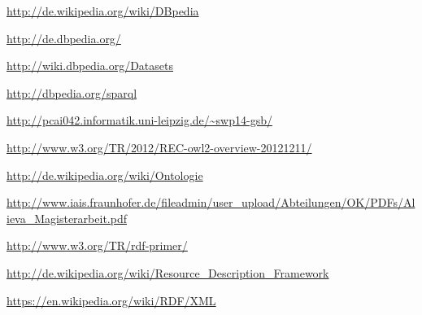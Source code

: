 



\begin{thebibliography}{99}
  \url{http://de.wikipedia.org/wiki/DBpedia}

  \url{http://de.dbpedia.org/}

  \url{http://wiki.dbpedia.org/Datasets}

  \url{http://dbpedia.org/sparql}

  \url{http://pcai042.informatik.uni-leipzig.de/~swp14-gsb/}




  \url{http://www.w3.org/TR/2012/REC-owl2-overview-20121211/}

  \url{http://de.wikipedia.org/wiki/Ontologie}

  \url{http://www.iais.fraunhofer.de/fileadmin/user_upload/Abteilungen/OK/PDFs/Alieva_Magisterarbeit.pdf}

  \url{http://www.w3.org/TR/rdf-primer/}

  \url{http://de.wikipedia.org/wiki/Resource_Description_Framework}

  \url{https://en.wikipedia.org/wiki/RDF/XML}



\end{thebibliography}
